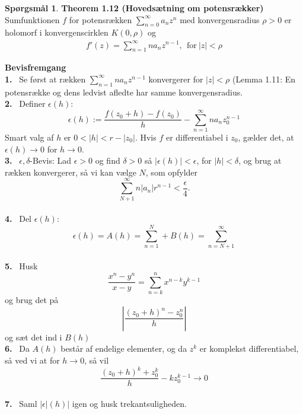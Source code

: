 \documentclass[10pt,a4paper]{article}
\theoremstyle{definition}
\newtheorem{Prob}{Spørgsmål}
\begin{document}
\newpage
\begin{Prob}{\textbf{Theorem 1.12 (Hovedsætning om potensrækker)}} \\

Sumfunktionen $f$ for potensrækken $\sum\limits_{n=0}^\infty a_n z^n$ med konvergensradius $\rho > 0$ er holomorf i konvergenscirklen $K(0,\rho)$ og
\begin{align*}
f'(z) = \sum\limits_{n=1}^\infty n a_n z^{n-1}, \ \  \text{for} \ \left| z \right| < \rho
\end{align*}
\end{Prob}

\begin{framed}
\textbf{Bevisfremgang} \\
\textbf{1.} \ Se først at rækken $\sum\limits_{n=1}^\infty n a_n z^{n-1}$ konvergerer for $\left| z \right| < \rho$  (Lemma 1.11: En potensrække og dens ledvist afledte har samme konvergensradius. \\
\textbf{2.} \ Definer $\epsilon(h)$:
$$\epsilon(h):= \frac{f(z_0 + h) - f(z_0)}{h} - \sum\limits_{n=1}^\infty n a_n z_0^{n-1}$$
Smart valg af $h$ er $0 < |h| < r - |z_0|$. Hvis $f$ er differentiabel i $z_0$, gælder det, at $\epsilon (h) \rightarrow 0$ for $h \rightarrow 0$.\\
\textbf{3.} \ $\epsilon,\delta$-Bevis: Lad $\epsilon > 0$ og find $\delta > 0$ så $\left| \epsilon (h) \right| < \epsilon$, for  $\left|  h \right| < \delta$, og brug at rækken konvergerer, så vi kan vælge $N$, som opfylder
$$\sum\limits_{N + 1}^\infty n \left| a_n \right| r^{n-1} < \frac{\epsilon}{4}.$$\\
\textbf{4.} \ Del $\epsilon(h)$:
$$\epsilon(h) = A(h) = \sum\limits_{n=1}^N + B(h) = \sum\limits_{n=N+1}^\infty $$ \\
\textbf{5.} \  Husk
$$ \frac{x^n - y^n}{x-y} = \sum\limits_{n=k}^n x^{n-k} y^{k-1}$$
og brug det på
$$\left| \frac{(z_0 + h)^n - z_0^n}{h} \right|$$ 
og sæt det ind i $B(h)$\\
\textbf{6.} \ Da $A(h)$ består af endelige elementer, og da $z^k$ er komplekst differentiabel, så ved vi at for $h \rightarrow 0$, så vil
$$ \frac{(z_0 + h)^k + z_0^k}{h} - k z_0^{k-1} \rightarrow 0$$ \\
\textbf{7.} \ Saml $|\epsilon|(h)|$ igen og husk trekantsuligheden.
\end{framed}
\end{document}
